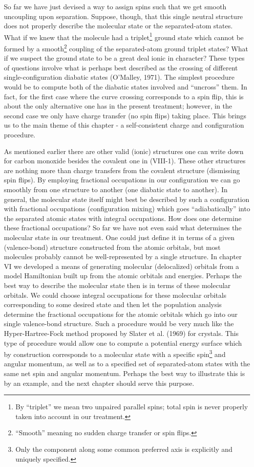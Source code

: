 \documentclass[12pt,letterpaper]{report}
\begin{document}
So far we have just devised a way to assign spins such that we get smooth uncoupling upon separation. Suppose, though, that this single neutral structure does not properly describe the molecular state or the separated-atom states. What if we knew that the molecule had a triplet\footnote{By ``triplet'' we mean two unpaired parallel spins; total spin is never properly taken into account in our treatment.} ground state which cannot be formed by a smooth\footnote{``Smooth'' meaning no sudden charge transfer or spin flips.} coupling of the separated-atom ground triplet states? What if we suspect the ground state to be a great deal ionic in character? These types of questions involve what is perhaps best described as the crossing of different single-configuration diabatic states (O'Malley, 1971). The simplest procedure would be to compute both of the diabatic states involved and ``uncross'' them. In fact, for the first case where the curve crossing corresponds to a spin flip, this is about the only alternative one has in the present treatment; however, in the second case we only have charge transfer (no spin flips) taking place. This brings us to the main theme of this chapter - a self-consistent charge and configuration procedure.

As mentioned earlier there are other valid (ionic) structures one can write down for carbon monoxide besides the covalent one in (VIII-1). These other structures are nothing more than charge transfers from the covalent structure (dismissing spin flips). By employing fractional occupations in our configuration we can go smoothly from one structure to another (one diabatic state to another). In general, the molecular state itself might best be described by such a configuration with fractional occupations (configuration mixing) which goes ``adiabatically'' into the separated atomic states with integral occupations. How does one determine these fractional occupations? So far we have not even said what determines the molecular state in our treatment. One could just define it in terms of a given (valence-bond) structure constructed from the atomic orbitals, but most molecules probably cannot be well-represented by a single structure. In chapter VI we developed a means of generating molecular (delocalized) orbitals from a model Hamiltonian built up from the atomic orbitals and energies. Perhaps the best way to describe the molecular state then is in terms of these molecular orbitals. We could choose integral occupations for these molecular orbitals corresponding to some desired state and then let the population analysis determine the fractional occupations for the atomic orbitals which go into our single valence-bond structure. Such a procedure would be very much like the Hyper-Hartree-Fock method proposed by Slater et al. (1969) for crystals. This type of procedure would allow one to compute a potential energy surface which by construction corresponds to a molecular state with a specific spin\footnote{Only the component along some common preferred axis is explicitly and uniquely specified.} and angular momentum, as well as to a specified set of separated-atom states with the same net spin and angular momentum. Perhaps the best way to illustrate this is by an example, and the next chapter should serve this purpose.
\end{document}
